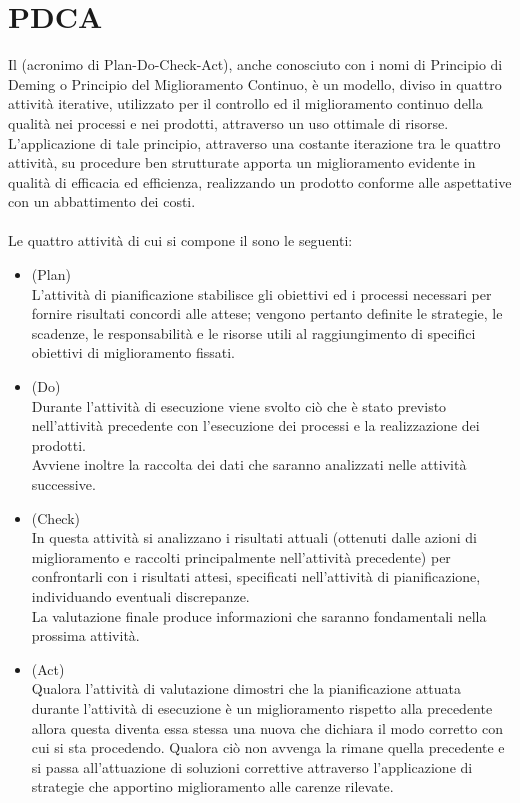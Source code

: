 \documentclass[a4paper, titlepage]{article}
\begin{document}
\section{PDCA}
\label{app:PDCA}
Il  (acronimo di Plan-Do-Check-Act), anche conosciuto con i nomi di Principio di Deming o Principio del Miglioramento Continuo, è un modello, diviso in quattro attività iterative, utilizzato per il controllo ed il miglioramento continuo della qualità nei processi e nei prodotti, attraverso un uso  ottimale di risorse. 
\newline L'applicazione di tale principio, attraverso una costante iterazione tra le quattro attività, su procedure ben strutturate apporta un miglioramento evidente in qualità di efficacia ed efficienza, realizzando un prodotto conforme alle aspettative con un abbattimento dei costi.
\\
\\ Le quattro attività di cui si compone il  sono le seguenti:
\begin{itemize}
\item {} (Plan)
\\ L'attività di pianificazione stabilisce gli obiettivi ed i processi necessari per fornire risultati concordi alle attese; vengono pertanto definite le strategie, le scadenze, le responsabilità e le risorse utili al raggiungimento di specifici obiettivi di miglioramento fissati.
\\
\item {} (Do)
\\ Durante l'attività di esecuzione viene svolto ciò che è stato previsto nell'attività precedente con l'esecuzione dei processi e la realizzazione dei prodotti.
\\Avviene inoltre la raccolta dei dati che saranno analizzati nelle attività successive.
\\
\item {} (Check)
\\In questa attività si analizzano i risultati attuali (ottenuti dalle azioni di miglioramento e raccolti principalmente nell'attività precedente) per confrontarli con i risultati attesi, specificati nell'attività di pianificazione, individuando eventuali discrepanze.
\\La valutazione finale produce informazioni che saranno fondamentali nella prossima attività.
\\
\item {} (Act)
\\Qualora l'attività di valutazione dimostri che la pianificazione attuata durante l'attività di esecuzione è un miglioramento rispetto alla precedente  allora questa diventa essa stessa una nuova  che dichiara il modo corretto con cui si sta procedendo.
Qualora ciò non avvenga la  rimane quella precedente e si passa all'attuazione di soluzioni correttive attraverso l'applicazione di strategie che apportino miglioramento alle carenze rilevate.
\end{itemize}
\end{document}
